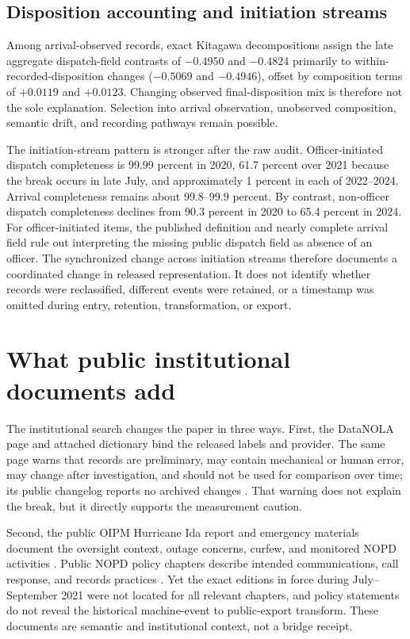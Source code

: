 \documentclass[11pt]{article}
\begin{document}
\subsection{Disposition accounting and initiation streams}

Among arrival-observed records, exact Kitagawa decompositions assign the late aggregate dispatch-field contrasts of $-0.4950$ and $-0.4824$ primarily to within-recorded-disposition changes ($-0.5069$ and $-0.4946$), offset by composition terms of $+0.0119$ and $+0.0123$. Changing observed final-disposition mix is therefore not the sole explanation. Selection into arrival observation, unobserved composition, semantic drift, and recording pathways remain possible.

The initiation-stream pattern is stronger after the raw audit. Officer-initiated dispatch completeness is 99.99 percent in 2020, 61.7 percent over 2021 because the break occurs in late July, and approximately 1 percent in each of 2022--2024. Arrival completeness remains about 99.8--99.9 percent. By contrast, non-officer dispatch completeness declines from 90.3 percent in 2020 to 65.4 percent in 2024. For officer-initiated items, the published definition and nearly complete arrival field rule out interpreting the missing public dispatch field as absence of an officer. The synchronized change across initiation streams therefore documents a coordinated change in released representation. It does not identify whether records were reclassified, different events were retained, or a timestamp was omitted during entry, retention, transformation, or export.

\section{What public institutional documents add}

The institutional search changes the paper in three ways. First, the DataNOLA page and attached dictionary bind the released labels and provider. The same page warns that records are preliminary, may contain mechanical or human error, may change after investigation, and should not be used for comparison over time; its public changelog reports no archived changes \citep{DataNOLA2021}. That warning does not explain the break, but it directly supports the measurement caution.

Second, the public OIPM Hurricane Ida report and emergency materials document the oversight context, outage concerns, curfew, and monitored NOPD activities \citep{OIPM2021}. Public NOPD policy chapters describe intended communications, call response, and records practices \citep{NOPDPolicies2023}. Yet the exact editions in force during July--September 2021 were not located for all relevant chapters, and policy statements do not reveal the historical machine-event to public-export transform. These documents are semantic and institutional context, not a bridge receipt.
\end{document}
